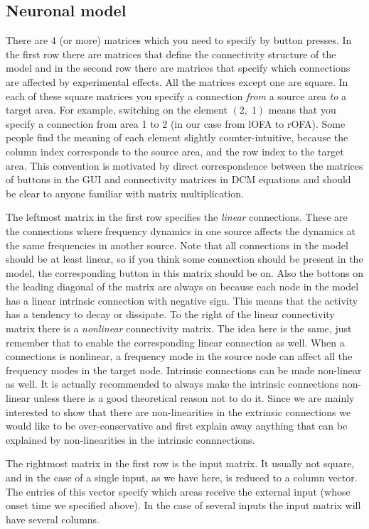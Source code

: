 \subsection{Neuronal model}
There are 4 (or more) matrices which you need to specify by button presses. In the first row there are matrices that define the connectivity structure of the model and in the second row there are matrices that specify which connections are affected by experimental effects. All the matrices except one are square. In each of these square matrices you specify a connection \textit{from} a source area \textit{to} a target area. For example, switching on the element $(2,\;1)$ means that you specify a connection from area 1 to 2 (in our case from lOFA to rOFA). Some people find the meaning of each element slightly counter-intuitive, because the column index corresponds to the source area, and the row index to the target area. This convention is motivated by direct correspondence between the matrices of buttons in the GUI and connectivity matrices in DCM equations and should be clear to anyone familiar with matrix multiplication.

The leftmost matrix in the first row specifies the \textit{linear} connections. These are the connections where frequency dynamics in one source affects the dynamics at the same frequencies in another source. Note that all connections in the model should be at least linear, so if you think some connection should be present in the model, the corresponding button in this matrix should be on. Also the bottons on the leading diagonal of the matrix are always on because each node in the model has a linear  intrinsic connection with negative sign. This means that the activity has a tendency to decay or dissipate. To the right of the linear connectivity matrix there is a \textit{nonlinear} connectivity matrix. The idea here is the same, just remember that to enable the corresponding linear connection as well. When a connections is nonlinear, a frequency mode in the source node can affect all the frequency modes in the target node. Intrinsic connections can be made non-linear as well. It is actually recommended to always make the intrinsic connections non-linear unless there is a good theoretical reason not to do it. Since we are mainly interested to show that there are non-linearities in the extrinsic connections we would like to be over-conservative and first explain away anything that can be explained by non-linearities in the intrinsic connnections.

The rightmost matrix in the first row is the input matrix. It usually not square, and in the case of a single input, as we have here, is reduced to a column vector. The entries of this vector specify which areas receive the external input (whose onset time we specified above). In the case of several inputs the input matrix will have several columns.

